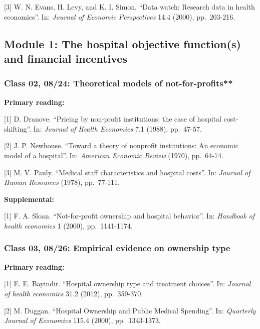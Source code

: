 \documentclass[11pt,]{article}
\begin{document}
{[}3{]} W. N. Evans, H. Levy, and K. I. Simon. ``Data watch: Research
data in health economics''. In: \emph{Journal of Economic Perspectives}
14.4 (2000), pp.~203-216.

\hypertarget{module-1-the-hospital-objective-functions-and-financial-incentives}{%
\subsection{Module 1: The hospital objective function(s) and financial
incentives}\label{module-1-the-hospital-objective-functions-and-financial-incentives}}

\hypertarget{class-02-0824-theoretical-models-of-not-for-profits}{%
\subsubsection{Class 02, 08/24: Theoretical models of
not-for-profits**}\label{class-02-0824-theoretical-models-of-not-for-profits}}

\textbf{Primary reading:}

{[}1{]} D. Dranove. ``Pricing by non-profit institutions: the case of
hospital cost-shifting''. In: \emph{Journal of Health Economics} 7.1
(1988), pp.~47-57.

{[}2{]} J. P. Newhouse. ``Toward a theory of nonprofit institutions: An
economic model of a hospital''. In: \emph{American Economic Review}
(1970), pp.~64-74.

{[}3{]} M. V. Pauly. ``Medical staff characteristics and hospital
costs''. In: \emph{Journal of Human Resources} (1978), pp.~77-111.

\textbf{Supplemental:}

{[}1{]} F. A. Sloan. ``Not-for-profit ownership and hospital behavior''.
In: \emph{Handbook of health economics} 1 (2000), pp.~1141-1174.

\hypertarget{class-03-0826-empirical-evidence-on-ownership-type}{%
\subsubsection{Class 03, 08/26: Empirical evidence on ownership
type}\label{class-03-0826-empirical-evidence-on-ownership-type}}

\textbf{Primary reading:}

{[}1{]} E. E. Bayindir. ``Hospital ownership type and treatment
choices''. In: \emph{Journal of health economics} 31.2 (2012),
pp.~359-370.

{[}2{]} M. Duggan. ``Hospital Ownership and Public Medical Spending''.
In: \emph{Quarterly Journal of Economics} 115.4 (2000), pp.~1343-1373.
\end{document}
